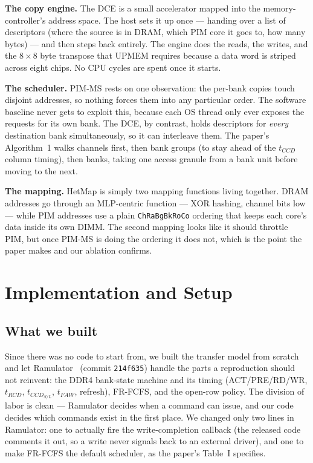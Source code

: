 \documentclass[conference]{IEEEtran}
\begin{document}
\textbf{The copy engine.} The DCE is a small accelerator mapped into the
memory-controller's address space. The host sets it up once --- handing over a
list of descriptors (where the source is in DRAM, which PIM core it goes to, how
many bytes) --- and then steps back entirely. The engine does the reads, the
writes, and the $8\times8$ byte transpose that UPMEM requires because a data word
is striped across eight chips. No CPU cycles are spent once it starts.

\textbf{The scheduler.} PIM-MS rests on one observation: the per-bank copies
touch disjoint addresses, so nothing forces them into any particular order. The
software baseline never gets to exploit this, because each OS thread only ever
exposes the requests for its own bank. The DCE, by contrast, holds descriptors
for \emph{every} destination bank simultaneously, so it can interleave them. The
paper's Algorithm~1 walks channels first, then bank groups (to stay ahead of the
$t_{CCD}$ column timing), then banks, taking one access granule from a bank unit
before moving to the next.

\textbf{The mapping.} HetMap is simply two mapping functions living together.
DRAM addresses go through an MLP-centric function --- XOR hashing, channel bits
low --- while PIM addresses use a plain \texttt{ChRaBgBkRoCo} ordering that keeps
each core's data inside its own DIMM. The second mapping looks like it should
throttle PIM, but once PIM-MS is doing the ordering it does not, which is the
point the paper makes and our ablation confirms.

\section{Implementation and Setup}
\subsection{What we built}
Since there was no code to start from, we built the transfer model from scratch
and let Ramulator~\cite{ramulator} (commit \texttt{214f635}) handle the parts a
reproduction should not reinvent: the DDR4 bank-state machine and its timing
(ACT/PRE/RD/WR, $t_{RCD}$, $t_{CCD_{S/L}}$, $t_{FAW}$, refresh), FR-FCFS, and the
open-row policy. The division of labor is clean --- Ramulator decides when a
command can issue, and our code decides which commands exist in the first place.
We changed only two lines in Ramulator: one to actually fire the write-completion
callback (the released code comments it out, so a write never signals back to an
external driver), and one to make FR-FCFS the default scheduler, as the paper's
Table~I specifies.
\end{document}
